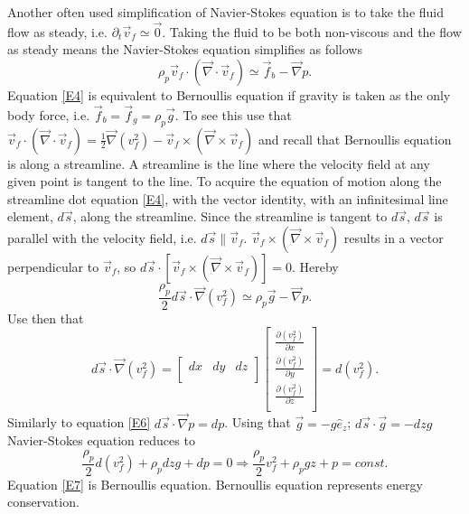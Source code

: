 \begin{example}
	Another often used simplification of Navier-Stokes equation is to take the fluid flow as steady, i.e. $\partial_t\vec{v}_f\simeq \vec{0}$. Taking the fluid to be both non-viscous and the flow as steady means the Navier-Stokes equation simplifies as follows
	\begin{equation}
		\rho_p\vec{v}_f\cdot(\vec{\nabla}\cdot \vec{v}_f)\simeq \vec{f}_{b}-\vec{\nabla}p.
		\label{E4}
	\end{equation} 
	Equation \eqref{E4} is equivalent to Bernoullis equation if gravity is taken as the only body force, i.e. $\vec{f}_b=\vec{f}_g=\rho_p\vec{g}$. To see this use that $\vec{v}_f\cdot(\vec{\nabla}\cdot \vec{v}_f)=\frac{1}{2}\vec{\nabla}(v_f^2)-\vec{v}_f\times(\vec{\nabla}\times\vec{v}_f)$ and recall that Bernoullis equation is along a streamline. A streamline is the line where the velocity field at any given point is tangent to the line. To acquire the equation of motion along the streamline dot equation \eqref{E4}, with the vector identity, with an infinitesimal line element, $d\vec{s}$, along the streamline. Since the streamline is tangent to $d\vec{s}$, $d\vec{s}$ is parallel with the velocity field, i.e. $d\vec{s}\parallel\vec{v}_f$. $\vec{v}_f\times(\vec{\nabla}\times\vec{v}_f)$ results in a vector perpendicular to $\vec{v}_f$, so $d\vec{s}\cdot [\vec{v}_f\times(\vec{\nabla}\times\vec{v}_f)]=0$. Hereby
	\begin{equation}
		\frac{\rho_p}{2}d\vec{s}\cdot\vec{\nabla}(v_f^2)\simeq \rho_p\vec{g}-\vec{\nabla}p.
		\label{E5}
	\end{equation}  
	Use then that
	\begin{equation}
		d\vec{s}\cdot\vec{\nabla}(v_f^2)=\begin{bmatrix}
			dx &
			dy &
			dz\\
		\end{bmatrix} \begin{bmatrix}
			\frac{\partial (v_f^2)}{\partial x}\\
			\frac{\partial (v_f^2)}{\partial y}\\
			\frac{\partial (v_f^2)}{\partial z}\\
		\end{bmatrix}=d(v_f^2).
		\label{E6}
	\end{equation} 
	Similarly to equation \eqref{E6} $d\vec{s}\cdot \vec{\nabla}p=dp$. Using that $\vec{g}=-g\hat{e}_z$; $d\vec{s}\cdot\vec{g}=-dzg$ Navier-Stokes equation reduces to
	\begin{equation}
		\frac{\rho_p}{2}d(v_f^2)+\rho_pdzg+dp=0\Rightarrow \frac{\rho_p}{2}v_f^2+\rho_pgz+p=const.
		\label{E7}
	\end{equation} 
	Equation \eqref{E7} is Bernoullis equation.	Bernoullis equation represents energy conservation. 
\end{example}

